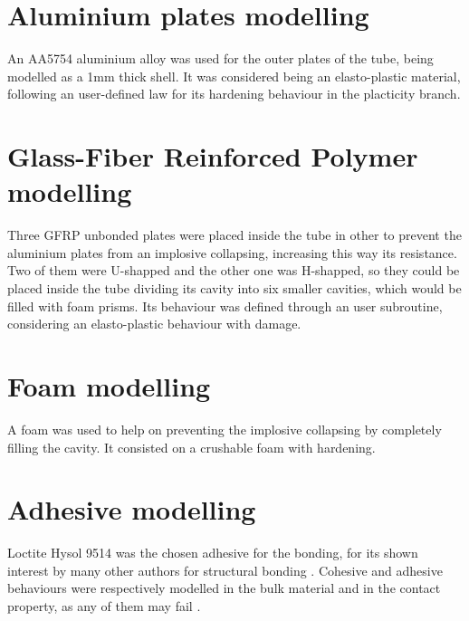 \section{Aluminium plates modelling} %

An AA5754 aluminium alloy was used for the outer plates of the tube, being modelled as a 1mm thick shell. It was considered being an elasto-plastic material, following an user-defined law for its hardening behaviour in the placticity branch.

\section{Glass-Fiber Reinforced Polymer modelling} %

Three GFRP unbonded plates were placed inside the tube in other to prevent the aluminium plates from an implosive collapsing, increasing this way its resistance. Two of them were U-shapped and the other one was H-shapped, so they could be placed inside the tube dividing its cavity into six smaller cavities, which would be filled with foam prisms. Its behaviour was defined through an user subroutine, considering an elasto-plastic behaviour with damage.

\section{Foam modelling} %

A foam was used to help on preventing the implosive collapsing by completely filling the cavity. It consisted on a crushable foam with hardening.

\section{Adhesive modelling} %

Loctite Hysol 9514 was the chosen adhesive for the bonding, for its shown interest by many other authors for structural bonding \citep{Sadowski2010, Scattina2011, SernaMoreno2015}. Cohesive and adhesive behaviours were respectively modelled in the bulk material and in the contact property, as any of them may fail \citep{Wu2013}.

